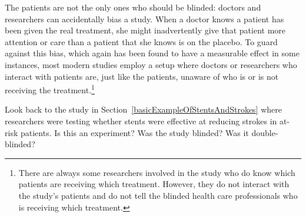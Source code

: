 The patients are not the only ones who should be blinded:
doctors and researchers can accidentally bias a study.
When a doctor knows a patient has been given the real treatment,
she might inadvertently give that patient more attention or care
than a patient that she knows is on the placebo.
To guard against this bias, which again has been found to have
a measurable effect in some instances, most modern studies employ
a  setup where doctors or researchers who
interact with patients are, just like the patients,
unaware of who is or is not receiving the
treatment.\footnote{There are always some researchers involved
  in the study who do know which patients are receiving which
  treatment.
  However, they do not interact with the study's patients and
  do not tell the blinded health care professionals who is
  receiving which treatment.}

\begin{exercisewrap}
\begin{nexercise}
Look back to the study in Section~\ref{basicExampleOfStentsAndStrokes} where researchers were testing whether stents were effective at reducing strokes in at-risk patients. Is this an experiment? Was the study blinded? Was it double-blinded?\footnotemark
\end{nexercise}
\end{exercisewrap}
